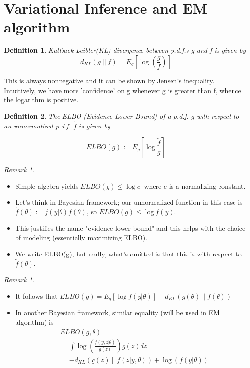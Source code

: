\documentclass{article}
\newtheorem{definition}{Definition}
\theoremstyle{remark}
\newtheorem{remark}[example]{Remark}
\begin{document}
\section*{Variational Inference and EM algorithm}
\begin{definition}
Kullback-Leibler(KL) divergence between p.d.f.s g and f is given by
    $$d_{KL}(g\|f)=E_g[\log(\frac gf)]$$
\end{definition}
This is always nonnegative and it can be shown by Jensen's inequality. Intuitively, 
we have more 'confidence' on g whenever g is greater than f, whence the logarithm is positive.
\begin{definition}
The ELBO (Evidence Lower-Bound) of a p.d.f. g with respect to an unnormalized p.d.f. $\tilde{f}$ is given by

$$ELBO(g):=E_g[\log \frac{\tilde{f}}{g}]$$
\end{definition}
\begin{remark}
\begin{itemize}
\item Simple algebra yields $ELBO(g)\leq \log c$, where c is a normalizing constant.
\item Let's think in Bayesian framework; our unnormalized function in this case is
    $\tilde{f}(\theta):=f(y\vert \theta)f(\theta)$, so $ELBO(g)\leq\log f(y)$.
\item This justifies the name "evidence lower-bound" and this helps with the choice of modeling (essentially maximizing ELBO).
\item We write ELBO(g), but really, what's omitted is that this is with respect to $\tilde f(\theta)$.
\end{itemize}
\end{remark}
\begin{remark}
    \begin{itemize}
\item It follows that $ELBO(g)=E_g[\log f(y\rvert \theta)]-d_{KL}(g(\theta)\| f(\theta))$\\
\item In another Bayesian framework, similar equality (will be used in EM algorithm) is
\begin{align*}
        & ELBO(g,\theta)\\
        & =\int \log(\frac{f(y,z\vert\theta)}{g(z)})g(z)dz\\
        & =-d_{KL}(g(z)\| f(z\vert y,\theta))+\log(f(y\vert\theta))
\end{align*}
\end{itemize}
\end{remark}
\end{document}
